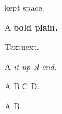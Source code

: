 \documentclass{article}
\begin{document}
\startpara{} kept space.

A \opengrp\bfseries bold\closegrp{} plain.

Text\endpara\noindent next.

A \opensg\itshape it\closesg{} up \openhm\slshape sl\closehm{} end.

A  B \pafter C \pbefore D.

A  B.
\end{document}
